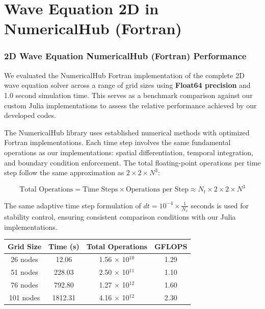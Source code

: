 \clearpage

\section{Wave Equation 2D in NumericalHub (Fortran)}
\label{sec:wave_2d_fortran}

\subsubsection*{2D Wave Equation NumericalHub (Fortran) Performance}

We evaluated the NumericalHub Fortran implementation of the complete 2D wave equation solver across a range of grid sizes using \textbf{Float64 precision} and 1.0 second simulation time. This serves as a benchmark comparison against our custom Julia implementations to assess the relative performance achieved by our developed codes.

The NumericalHub library uses established numerical methods with optimized Fortran implementations. Each time step involves the same fundamental operations as our implementations: spatial differentiation, temporal integration, and boundary condition enforcement. The total floating-point operations per time step follow the same approximation as $2 \times 2 \times N^3$:

\begin{equation}
\text{Total Operations} = \text{Time Steps} \times \text{Operations per Step} \approx N_t \times 2 \times 2 \times N^3
\end{equation}

The same adaptive time step formulation of $dt = 10^{-4} \times \frac{1}{N_{x}}$ seconds is used for stability control, ensuring consistent comparison conditions with our Julia implementations.

\vspace{1em}

\begin{tabular*}{\linewidth}{@{\extracolsep{\fill}}cccc}
\toprule
\textbf{Grid Size} & \textbf{Time (s)} & \textbf{Total Operations} & \textbf{GFLOPS} \\
\midrule
26 nodes & 12.06 & 1.56 $\times$ 10$^{10}$ & 1.29 \\
51 nodes & 228.03 & 2.50 $\times$ 10$^{11}$ & 1.10 \\
76 nodes & 792.80 & 1.27 $\times$ 10$^{12}$ & 1.60 \\
101 nodes & 1812.31 & 4.16 $\times$ 10$^{12}$ & 2.30 \\
\bottomrule
\end{tabular*}

